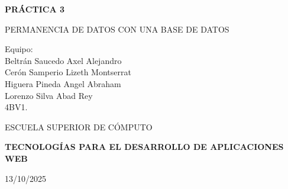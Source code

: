 \documentclass[12pt]{article}
\begin{document}

\begin{titlepage}
    \thispagestyle{empty}
    
    
    \begin{spacing}{1.5}
        {\Huge \bfseries \noindent PRÁCTICA 3}
        \vspace{10pt}

        {\LARGE PERMANENCIA DE DATOS CON UNA BASE DE DATOS}
        
        \vspace{1cm}
        
        {\Large Equipo:} \\
        {\Large Beltrán Saucedo Axel Alejandro} \\
        {\Large Cerón Samperio Lizeth Montserrat} \\
        {\Large Higuera Pineda Angel Abraham} \\
        {\Large Lorenzo Silva Abad Rey} \\
        {\Large 4BV1.}
    \end{spacing}
    
    \vspace{1.5cm}

    \begin{minipage}{7.5cm} %
        {\Large ESCUELA SUPERIOR DE CÓMPUTO}
    \end{minipage}

    \vfill %

    \begin{flushleft}
        {\Large \color{black}
        \textbf{TECNOLOGÍAS PARA EL DESARROLLO DE APLICACIONES WEB}}
        
        \vspace{0.5cm}
        
        13/10/2025
    \end{flushleft}
    \vspace{1cm}
\end{titlepage}
\end{document}
